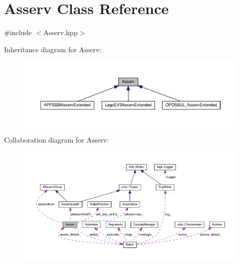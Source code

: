 \hypertarget{classAsserv}{}\section{Asserv Class Reference}
\label{classAsserv}


{\ttfamily \#include $<$Asserv.\+hpp$>$}



Inheritance diagram for Asserv\+:
\nopagebreak
\begin{figure}[H]
\begin{center}
\leavevmode
\includegraphics[width=350pt]{classAsserv__inherit__graph}
\end{center}
\end{figure}


Collaboration diagram for Asserv\+:
\nopagebreak
\begin{figure}[H]
\begin{center}
\leavevmode
\includegraphics[width=350pt]{classAsserv__coll__graph}
\end{center}
\end{figure}
